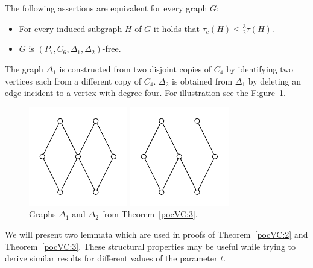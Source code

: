 \begin{thm}\label{pocVC:3}
The following assertions are equivalent for every graph \(G\):
\begin{itemize}
\item For every induced subgraph \(H\) of \(G\) it holds that \(\tau_c(H) \leq \frac{3}{2}\tau(H)\).
\item \(G\) is \((P_7 , C_6 , \Delta_1 , \Delta_2)\)-free.
\end{itemize}
\end{thm}

The graph \(\Delta_1\) is constructed from two disjoint copies of \(C_4\) by identifying two vertices each from a different copy of \(C_4\).
\(\Delta_2\) is obtained from \(\Delta_1\) by deleting an edge incident to a vertex with degree four. 
For illustration see the Figure~\ref{pic:deltas}.
\begin{figure}[b]
        \centering
        \begin{minipage}{.5\textwidth}
                \centering
                \includegraphics[width=.5\linewidth]{pictures/VCpocdelta1}
		\caption*{}
        \end{minipage}%
        \begin{minipage}{.5\textwidth}
                \centering
                \includegraphics[width=.5\linewidth]{pictures/VCpocdelta2}
                \caption*{}
        \end{minipage}
        \caption{Graphs $\Delta_1$ and $\Delta_2$ from Theorem~\ref{pocVC:3}.}
	\label{pic:deltas}
\end{figure}
We will present two lemmata which are used in proofs of Theorem~\ref{pocVC:2} and Theorem~\ref{pocVC:3}.
These structural properties may be useful while trying to derive similar results for different values of the parameter \(t\).

